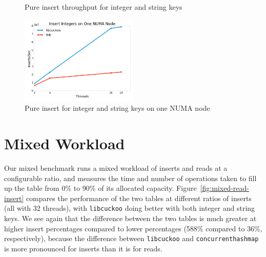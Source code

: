 \documentclass{article}
\newcommand{\tbbmap}{\texttt{concurrent\textunderscore hash\textunderscore map}}
\newcommand{\libcuckoo}{\texttt{libcuckoo}}
\begin{document}
\begin{figure}[!htbp]
  \centering
  \caption{Pure insert throughput for integer and string keys}
  \label{fig:pure-insert}
\end{figure}

\begin{figure}[!htbp]
  \centering
  \includegraphics[width=0.5\textwidth]{insert-integer-one-numa}
  \caption{Pure insert  for integer and string keys on one NUMA node}
  \label{fig:pure-insert-one-numa}
\end{figure}

\section*{Mixed Workload}
Our mixed benchmark runs a mixed workload of inserts and reads at a configurable
ratio, and measures the time and number of operations taken to fill up the table
from 0\% to 90\% of its allocated capacity. Figure~\ref{fig:mixed-read-insert}
compares the performance of the two tables at different ratios of inserts (all
with 32 threads), with {\libcuckoo} doing better with both integer and string
keys. We see again that the difference between the two tables is much greater at
higher insert percentages compared to lower percentages (588\% compared to 36\%,
respectively), because the difference between {\libcuckoo} and {\tbbmap} is more
pronounced for inserts than it is for reads.
\end{document}
